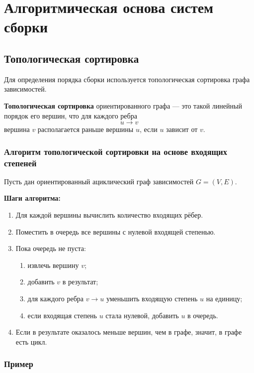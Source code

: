 \documentclass[12pt,a4paper]{article}
\begin{document}
\section{Алгоритмическая основа систем сборки}

\subsection{Топологическая сортировка}

Для определения порядка сборки используется топологическая сортировка графа зависимостей.

\textbf{Топологическая сортировка} ориентированного графа --- это такой линейный порядок его вершин, что для каждого ребра
\[
u \rightarrow v
\]
вершина $v$ располагается раньше вершины $u$, если $u$ зависит от $v$.

\subsubsection{Алгоритм топологической сортировки на основе входящих степеней}

Пусть дан ориентированный ациклический граф зависимостей $G=(V,E)$.

\textbf{Шаги алгоритма:}
\begin{enumerate}
    \item Для каждой вершины вычислить количество входящих рёбер.
    \item Поместить в очередь все вершины с нулевой входящей степенью.
    \item Пока очередь не пуста:
    \begin{enumerate}
        \item извлечь вершину $v$;
        \item добавить $v$ в результат;
        \item для каждого ребра $v \rightarrow u$ уменьшить входящую степень $u$ на единицу;
        \item если входящая степень $u$ стала нулевой, добавить $u$ в очередь.
    \end{enumerate}
    \item Если в результате оказалось меньше вершин, чем в графе, значит, в графе есть цикл.
\end{enumerate}

\subsubsection{Пример}
\end{document}
